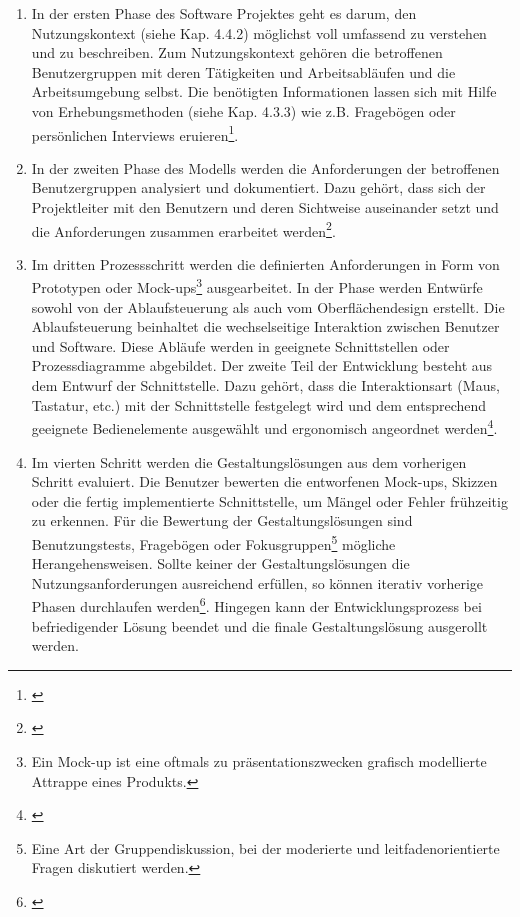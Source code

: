 \begin{enumerate}
    \item In der ersten Phase des Software Projektes geht es darum, den Nutzungskontext (siehe Kap. 4.4.2) möglichst voll umfassend zu verstehen und zu beschreiben. Zum Nutzungskontext gehören die betroffenen Benutzergruppen mit deren Tätigkeiten und Arbeitsabläufen und die Arbeitsumgebung selbst. Die benötigten Informationen lassen sich mit Hilfe von Erhebungsmethoden (siehe Kap. 4.3.3) wie z.B. Fragebögen oder persönlichen Interviews eruieren\footnote{\cite[vgl.][28\psq]{Ecker2016}}.
    \item In der zweiten Phase des Modells werden die Anforderungen der betroffenen Benutzergruppen analysiert und dokumentiert. Dazu gehört, dass sich der Projektleiter mit den Benutzern und deren Sichtweise auseinander setzt und die Anforderungen zusammen erarbeitet werden\footnote{\cite[vgl.][30\psq]{Ecker2016}}.
    \item Im dritten Prozessschritt werden die definierten Anforderungen in Form von Prototypen oder Mock-ups\footnote{Ein Mock-up ist eine oftmals zu präsentationszwecken grafisch modellierte Attrappe eines Produkts.} ausgearbeitet. In der Phase werden Entwürfe sowohl von der Ablaufsteuerung als auch vom Oberflächendesign erstellt. Die Ablaufsteuerung beinhaltet die wechselseitige Interaktion zwischen Benutzer und Software. Diese Abläufe werden in geeignete Schnittstellen oder Prozessdiagramme abgebildet. Der zweite Teil der Entwicklung besteht aus dem Entwurf der Schnittstelle. Dazu gehört, dass die Interaktionsart (Maus, Tastatur, etc.) mit der Schnittstelle festgelegt wird und dem entsprechend geeignete Bedienelemente ausgewählt und ergonomisch angeordnet werden\footnote{\cite[vgl.][33\psq]{Ecker2016}}.
    \item Im vierten Schritt werden die Gestaltungslösungen aus dem vorherigen Schritt evaluiert. Die Benutzer bewerten die entworfenen Mock-ups, Skizzen oder die fertig implementierte Schnittstelle, um Mängel oder Fehler frühzeitig zu erkennen. Für die Bewertung der Gestaltungslösungen sind Benutzungstests, Fragebögen oder Fokusgruppen\footnote{Eine Art der Gruppendiskussion, bei der moderierte und leitfadenorientierte Fragen diskutiert werden.} mögliche Herangehensweisen. Sollte keiner der Gestaltungslösungen die Nutzungsanforderungen ausreichend erfüllen, so können iterativ vorherige Phasen durchlaufen werden\footnote{\cite[vgl.][34\psq]{Ecker2016}}. Hingegen kann der Entwicklungsprozess bei befriedigender Lösung beendet und die finale Gestaltungslösung ausgerollt werden.
\end{enumerate}

